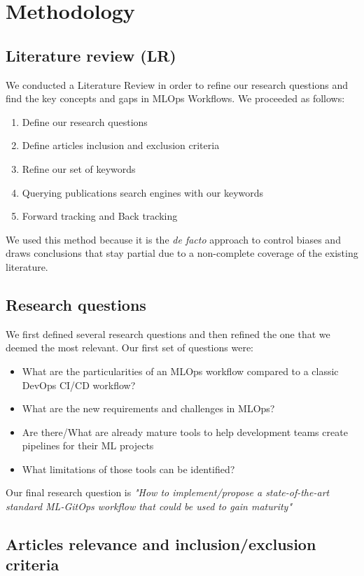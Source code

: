 \section{Methodology}\label{sec:methodo}
\subsection{Literature review (LR)}\label{subsec:literature-review-(lr)}

We conducted a Literature Review in order to refine our research questions and find the key concepts and gaps in MLOps Workflows.
We proceeded as follows:

\begin{enumerate}
    \item Define our research questions
    \item Define articles inclusion and exclusion criteria
    \item Refine our set of keywords
    \item Querying publications search engines with our keywords
    \item Forward tracking and Back tracking
\end{enumerate}

We used this method because it is the \textit{de facto} approach to control biases and draws conclusions that stay partial due to
a non-complete coverage of the existing literature.

\subsection{Research questions}\label{subsec:research-questions}

We first defined several research questions and then refined the one that we deemed the most relevant.
Our first set of questions were:
\begin{itemize}
    \item What are the particularities of an MLOps workflow compared to a classic DevOps CI/CD workflow?
    \item What are the new requirements and challenges in MLOps?
    \item Are there/What are already mature tools to help development teams create pipelines for their ML projects
    \item What limitations of those tools can be identified?
\end{itemize}

Our final research question is
\textit{"How to implement/propose a state-of-the-art standard ML-GitOps workflow that could be used to gain maturity"\cite{mlops-definition-tools-and-challenge,mlops-maturity-model}}

\subsection{Articles relevance and inclusion/exclusion criteria}\label{subsec:articles-relevance-and-inclusion/exclusion-criteria}

